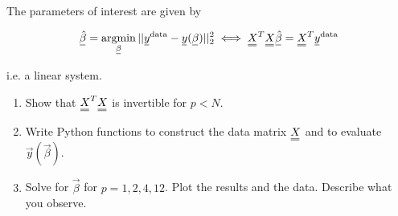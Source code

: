     The parameters of interest are given by

    \begin{equation}
        \vec{\hat{\beta}} = \argmin_{\vec{\beta}} ||\vec{y}^{\text{data}} - \vec{y}(\vec{\beta})||_2^2 \iff \mat{X}^T \mat{X} \vec{\hat{\beta}} = \mat{X}^T \vec{y}^{\text{data}}
    \end{equation}

    i.e. a linear system.

    \begin{enumerate}
        \item Show that $\mat{X}^T \mat{X}$ is invertible for $p<N$.
        \item Write Python functions to construct the data matrix $\mat{X}$ and to evaluate $\vec{y}(\vec{\beta})$.
        \item Solve for $\vec{\beta}$ for $p = 1, 2, 4, 12$. Plot the results and the data. Describe what you observe.
    \end{enumerate}

